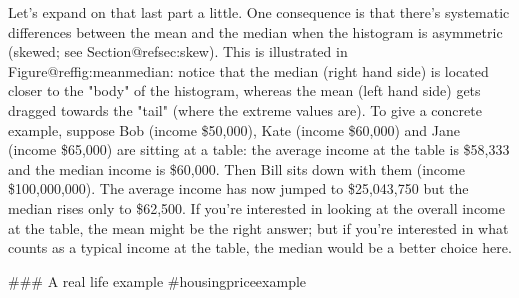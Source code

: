 Let's expand on that last part a little. One consequence is that there's systematic differences between the mean and the median when the histogram is asymmetric (skewed; see Section@refsec:skew). This is illustrated in Figure@reffig:meanmedian: notice that the median (right hand side) is located closer to the "body" of the histogram, whereas the mean (left hand side) gets dragged towards the "tail" (where the extreme values are). To give a concrete example, suppose Bob (income \$50,000), Kate (income \$60,000) and Jane (income \$65,000) are sitting at a table: the average income at the table is \$58,333 and the median income is \$60,000. Then Bill sits down with them (income \$100,000,000). The average income has now jumped to \$25,043,750 but the median rises only to \$62,500. If you're interested in looking at the overall income at the table, the mean might be the right answer; but if you're interested in what counts as a typical income at the table, the median would be a better choice here.


### A real life example {#housingpriceexample}

